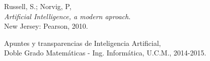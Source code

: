 \documentclass[11pt, a4paper, spanish, openright, twoside]{book}
\begin{document}
	
\begin{thebibliography}{9}

	Russell, S.; Norvig, P, \\
	\emph{Artificial Intelligence, a modern aproach}.\\
	New Jersey: Pearson, 2010.
	
	Apuntes y transparencias de Inteligencia Artificial, \\
	Doble Grado Matemáticas - Ing. Informática, U.C.M., 2014-2015.

\end{thebibliography}
\end{document}
